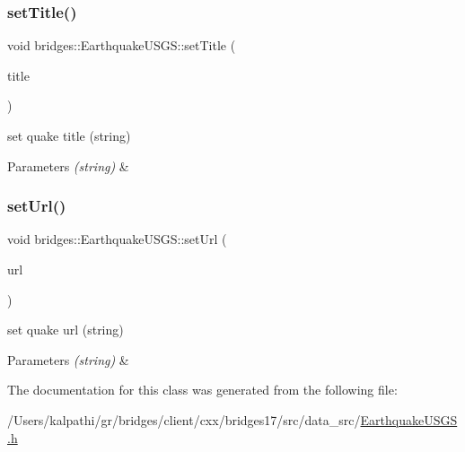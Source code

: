 \subsubsection{\texorpdfstring{set\+Title()}{setTitle()}}
{\footnotesize\ttfamily void bridges\+::\+Earthquake\+U\+S\+G\+S\+::set\+Title (\begin{DoxyParamCaption}\item[{const string \&}]{title }\end{DoxyParamCaption})\hspace{0.3cm}{\ttfamily [inline]}}

set quake title (string)


\begin{DoxyParams}{Parameters}
{\em (string)} & \\
\hline
\end{DoxyParams}
\mbox{\label{classbridges_1_1_earthquake_u_s_g_s_a4ee05f6d980ba3101f598c6cfd04fdf2}} 
\subsubsection{\texorpdfstring{set\+Url()}{setUrl()}}
{\footnotesize\ttfamily void bridges\+::\+Earthquake\+U\+S\+G\+S\+::set\+Url (\begin{DoxyParamCaption}\item[{const string \&}]{url }\end{DoxyParamCaption})\hspace{0.3cm}{\ttfamily [inline]}}

set quake url (string)


\begin{DoxyParams}{Parameters}
{\em (string)} & \\
\hline
\end{DoxyParams}


The documentation for this class was generated from the following file\+:\begin{DoxyCompactItemize}
\item 
/\+Users/kalpathi/gr/bridges/client/cxx/bridges17/src/data\+\_\+src/\mbox{\hyperlink{_earthquake_u_s_g_s_8h}{Earthquake\+U\+S\+G\+S.\+h}}\end{DoxyCompactItemize}
